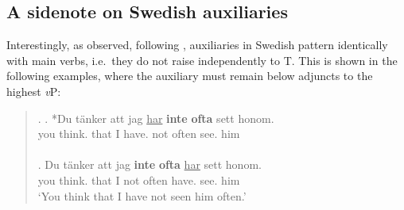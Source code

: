 \subsection{A sidenote on Swedish auxiliaries}\label{Se_aux_sec}
Interestingly, as \citet{lasnik1995} observed, following \citet{wexler1994}, auxiliaries in Swedish pattern identically with main verbs, i.e.\ they do not raise independently to T. This is shown in the following examples, where the auxiliary must remain below adjuncts to the highest {\it v}P:

\singlespacing
\begin{quote}
\ex.
\ag. *Du t\"{a}nker att jag \underline{har} \textbf{inte} \textbf{ofta} sett honom.\\
you think.\mbox{} that I have.\mbox{} not often see.\mbox{} him\\
\hspace{1pt}\\
\bg. Du t\"{a}nker att jag \textbf{inte} \textbf{ofta} \underline{har} sett honom.\\
you think.\mbox{} that I not often have.\mbox{} see.\mbox{} him\\
`You think that I have not seen him often.'\\

\end{quote}
\onehalfspacing
